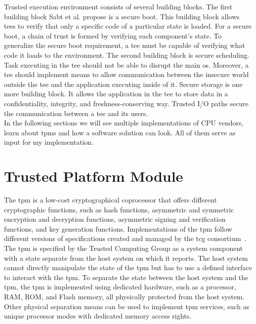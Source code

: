 Trusted execution environment consists of several building blocks. The first
building block Sabt et al. propose is a secure boot. This building block allows
\glspl{tee} to verify that only a specific code of a particular state is loaded.
For a secure boot, a chain of trust is formed by verifying each component's
state. To generalize the secure boot requirement, a \gls{tee} must be capable of
verifying what code it loads to the environment. The second building block is
secure scheduling. Task executing in the \gls{tee} should not be able to disrupt
the main \gls{os}. Moreover, a \gls{tee} should implement means to allow
communication between the insecure world outside the \gls{tee} and the
application executing inside of it. Secure storage is one more building block.
It allows the application in the \gls{tee} to store data in a confidentiality,
integrity, and freshness-conserving way. Trusted I/O paths secure the
communication between a \gls{tee} and its users.\\

In the following sections we will see multiple implementations of CPU vendors,
learn about \glspl{tpm} and how a software solution can look. All of them serve
as input for my implementation.

\section{Trusted Platform Module}
\label{sec:20:tpm}
The \gls{tpm} is a low-cost cryptographical coprocessor that offers different
cryptographic functions, such as hash functions, asymmetric and symmetric
encryption and decryption functions, asymmetric signing and verification
functions, and key generation functions. Implementations of the \gls{tpm} follow
different versions of specifications created and managed by the \gls{tcg}
consortium~\cite{tpm_architecture}. The \gls{tpm} is specified by the Trusted
Computing Group as a system component with a state separate from the host system
on which it reports. The host system cannot directly manipulate the state of the
\gls{tpm} but has to use a defined interface to interact with the \gls{tpm}. To
separate the state between the host system and the \gls{tpm}, the \gls{tpm} is
implemented using dedicated hardware, such as a processor, RAM, ROM, and Flash
memory, all physically protected from the host system. Other physical separation
means can be used to implement \gls{tpm} services, such as unique processor
modes with dedicated memory access rights.\\

